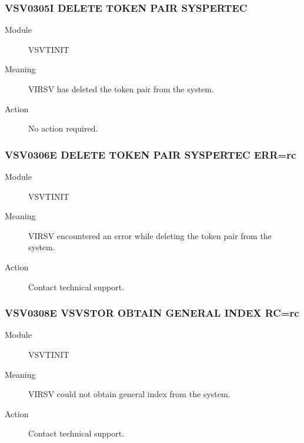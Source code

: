 \documentclass[letterpaper,10pt,english]{sphinxmanual}
\begin{document}
\subsubsection{VSV0305I DELETE TOKEN PAIR SYSPERTEC}
\label{\detokenize{messages:vsv0305i-delete-token-pair-syspertec}}\begin{description}
\item[{Module}] \leavevmode
VSVTINIT

\item[{Meaning}] \leavevmode
VIRSV has deleted the token pair from the system.

\item[{Action}] \leavevmode
No action required.

\end{description}


\subsubsection{VSV0306E DELETE TOKEN PAIR SYSPERTEC ERR=rc}
\label{\detokenize{messages:vsv0306e-delete-token-pair-syspertec-err-rc}}\begin{description}
\item[{Module}] \leavevmode
VSVTINIT

\item[{Meaning}] \leavevmode
VIRSV encountered an error while deleting the token pair from the system.

\item[{Action}] \leavevmode
Contact technical support.

\end{description}


\subsubsection{VSV0308E VSVSTOR OBTAIN GENERAL INDEX RC=rc}
\label{\detokenize{messages:vsv0308e-vsvstor-obtain-general-index-rc-rc}}\begin{description}
\item[{Module}] \leavevmode
VSVTINIT

\item[{Meaning}] \leavevmode
VIRSV could not obtain general index from the system.

\item[{Action}] \leavevmode
Contact technical support.

\end{description}
\end{document}
